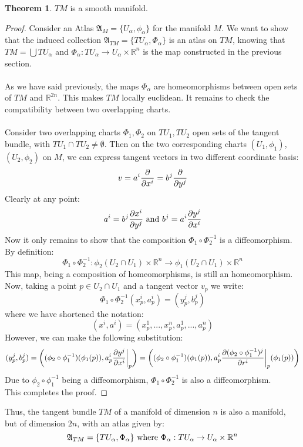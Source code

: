 \documentclass[12pt,a4paper]{report}
\theoremstyle{definition}
\theoremstyle{Theorem}
\newtheorem{Theo}[Def]{Theorem}
\theoremstyle{definition}
\theoremstyle{definition}
\begin{document}
	\begin{Theo}
		$TM$ is a smooth manifold.
	\end{Theo}
	\begin{proof}
		Consider an Atlas $\mathfrak{A}_M=\{U_\alpha,\phi_\alpha\}$ for the manifold $M$. We want to show that the induced collection $\mathfrak{A}_{TM}=\{TU_\alpha,\Phi_\alpha\}$ is an atlas on $TM$, knowing that $TM=\bigcup TU_\alpha$ and $\Phi_\alpha:TU_\alpha\rightarrow U_\alpha\times \mathbb{R}^n$ is the map constructed in the previous section.\\
		\\
		As we have said previously, the maps $\Phi_\alpha$ are homeomorphisms between open sets of $TM$ and $\mathbb{R}^{2n}$. This makes $TM$ locally euclidean. It remains to check the compatibility between two overlapping charts.\\
		\\
		Consider two overlapping charts $\Phi_1,\Phi_2$ on $TU_1,TU_2$ open sets of the tangent bundle, with $TU_1\cap TU_2\neq \emptyset$. Then on the two corresponding charts $(U_1,\phi_1)$, $(U_2,\phi_2)$ on $M$, we can express tangent vectors in two different coordinate basis:
		$$v=a^i{\partial\over \partial{x^i}}=b^j{\partial \over \partial y^j}$$
		Clearly at any point:
		$$a^i=b^j{\partial x^i\over\partial y^j} \hbox{ and } b^j=a^i{\partial y^j\over\partial x^i}$$
		Now it only remains to show that the composition $\Phi_1\circ \Phi_2^{-1}$ is a diffeomorphism.\\
		By definition:
		$$\Phi_1\circ \Phi_2^{-1}:\phi_2(U_2\cap U_1)\times \mathbb{R}^n\rightarrow \phi_1(U_2\cap U_1)\times \mathbb{R}^n$$
		This map, being a composition of homeomorphisms, is still an homeomorphism. Now, taking a point $p\in U_2\cap U_1$ and a tangent vector $v_p$ we write:
		$$\Phi_1\circ \Phi_2^{-1}(x^i_p,a^i_p)=(y^j_p,b^j_p)$$
		where we have shortened the notation:
		$$(x^i,a^i)=(x^1_p,...,x^n_p,a^1_p,...,a^n_p)$$
		However, we can make the following substitution:
		$$(y^j_p,b^j_p)=\bigg((\phi_2\circ \phi_1^{-1})(\phi_1(p)),a^i_p{\partial y^j\over\partial x^i}\bigg|_p\bigg)=\bigg((\phi_2\circ \phi_1^{-1})(\phi_1(p)),a^i_p{\partial (\phi_2\circ \phi_1^{-1})^j\over\partial r^i}\bigg|_p(\phi_1(p))\bigg)$$
		Due to $\phi_2\circ \phi_1^{-1}$ being a diffeomorphism, $\Phi_1\circ \Phi_2^{-1}$ is also a diffeomorphism.\\
		This completes the proof.
	\end{proof}
	Thus, the tangent bundle $TM$ of a manifold of dimension $n$ is also a manifold, but of dimension $2n$, with an atlas given by:
	$$\mathfrak{A}_{TM}=\{TU_\alpha,\Phi_\alpha\} \hbox{ where } \Phi_\alpha:TU_\alpha\rightarrow U_\alpha\times \mathbb{R}^n$$
\end{document}
